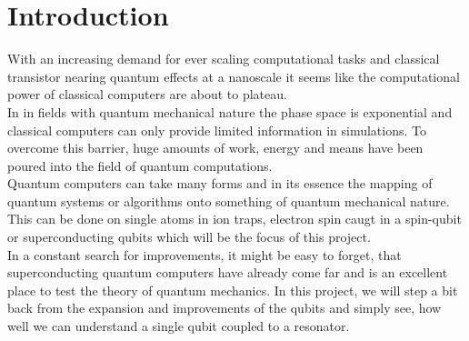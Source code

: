 \chapter{Introduction}
With an increasing demand for ever scaling computational tasks and classical transistor nearing quantum effects at a nanoscale it seems like the computational power of classical computers are about to plateau. \\
In in fields with quantum mechanical nature the phase space is exponential and classical computers can only provide limited information in simulations. To overcome this barrier, huge amounts of work, energy and means have been poured into the field of quantum computations. \\
Quantum computers can take many forms and in its essence the mapping of quantum systems or algorithms onto something of quantum mechanical nature. This can be done on single atoms in ion traps, electron spin caugt in a spin-qubit or superconducting qubits which will be the focus of this project. \\
In a constant search for improvements, it might be easy to forget, that superconducting quantum computers have already come far and is an excellent place to test the theory of quantum mechanics. In this project, we will step a bit back from the expansion and improvements of the qubits and simply see, how well we can understand a single qubit coupled to a resonator. 

